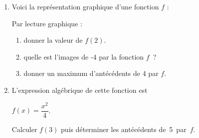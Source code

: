 \documentclass[exercice]{thedocument}%
\begin{document}
%
\begin{enumerate}
    \item Voici la représentation graphique d'une fonction $f$ :\par\noindent
    \par\noindent
    Par lecture graphique :
    \begin{enumerate}
        \item donner la valeur de $f(2)$.
        \item quelle est l'images de -4 par la fonction $f$~?
        \item donner un maximum d'antécédents de 4 par $f$.
    \end{enumerate}
    \item L'expression algébrique de cette fonction est\par\noindent
    {\centering$f(x)=\dfrac{x^2}4$.\par}\noindent
    Calculer $f(3)$ puis déterminer les antécédents de~5~par~$f$.
\end{enumerate}
\end{document}
